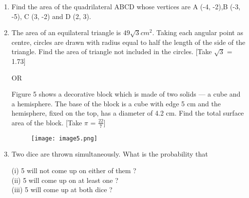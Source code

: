 \documentclass[journal,12pt,twocolumn]{IEEEtran}
\begin{document}
\begin{enumerate}
\item Find the area of the quadrilateral ABCD whose vertices are A (-4, -2),B (-3, -5), C (3, -2) and D (2, 3). \\
\item The area of an equilateral triangle is $49\sqrt{3} cm^2$. Taking each angular point as centre, circles are drawn with radius equal to half the length of the side of the triangle. Find the area of triangle not included in the circles. [Take $\sqrt{3}$ = 1.73]
\begin{center}
    OR
\end{center}
 Figure 5 shows a decorative block which is made of two solids — a cube and a hemisphere. The base of the  block is a cube with edge 5 cm and the hemisphere, fixed on the  top, has a diameter of 4.2 cm. Find the total surface area of the block. [Take $\pi$ = $\frac{22}{7} $]
\begin{figure}[h!]
    \centering
    \texttt{[image: image5.png]}
 \end{figure}
\item  Two dice are thrown simultaneously. What is the probability that
\begin{enumerate}
    (i)   5 will not come up on either of them ?\\
    (ii)  5 will come up on at least one ?\\
    (iii) 5 will come up at both dice ?\\
\end{enumerate}

\end{enumerate}
\end{document}
